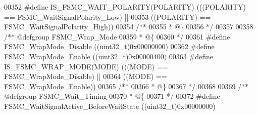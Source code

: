\begin{DoxyCode}
00352 \textcolor{preprocessor}{#}\textcolor{preprocessor}{define} \textcolor{preprocessor}{IS\_FSMC\_WAIT\_POLARITY}\textcolor{preprocessor}{(}\textcolor{preprocessor}{POLARITY}\textcolor{preprocessor}{)} \textcolor{preprocessor}{(}\textcolor{preprocessor}{(}\textcolor{preprocessor}{(}\textcolor{preprocessor}{POLARITY}\textcolor{preprocessor}{)} \textcolor{preprocessor}{==} 
      FSMC_WaitSignalPolarity_Low\textcolor{preprocessor}{)} \textcolor{preprocessor}{||}
00353                                          \textcolor{preprocessor}{(}\textcolor{preprocessor}{(}\textcolor{preprocessor}{POLARITY}\textcolor{preprocessor}{)} \textcolor{preprocessor}{==} 
      FSMC_WaitSignalPolarity_High\textcolor{preprocessor}{)}\textcolor{preprocessor}{)}
00354 \textcolor{comment}{/**}
00355 \textcolor{comment}{  * @\}}
00356 \textcolor{comment}{  */}
00357 
00358 \textcolor{comment}{/** @defgroup FSMC\_Wrap\_Mode }
00359 \textcolor{comment}{  * @\{}
00360 \textcolor{comment}{  */}
00361 \textcolor{preprocessor}{#}\textcolor{preprocessor}{define} \textcolor{preprocessor}{FSMC\_WrapMode\_Disable}                    \textcolor{preprocessor}{(}\textcolor{preprocessor}{(}\textcolor{preprocessor}{uint32\_t}\textcolor{preprocessor}{)}0x00000000\textcolor{preprocessor}{)}
00362 \textcolor{preprocessor}{#}\textcolor{preprocessor}{define} \textcolor{preprocessor}{FSMC\_WrapMode\_Enable}                     \textcolor{preprocessor}{(}\textcolor{preprocessor}{(}\textcolor{preprocessor}{uint32\_t}\textcolor{preprocessor}{)}0x00000400\textcolor{preprocessor}{)}
00363 \textcolor{preprocessor}{#}\textcolor{preprocessor}{define} \textcolor{preprocessor}{IS\_FSMC\_WRAP\_MODE}\textcolor{preprocessor}{(}\textcolor{preprocessor}{MODE}\textcolor{preprocessor}{)} \textcolor{preprocessor}{(}\textcolor{preprocessor}{(}\textcolor{preprocessor}{(}\textcolor{preprocessor}{MODE}\textcolor{preprocessor}{)} \textcolor{preprocessor}{==} FSMC_WrapMode_Disable\textcolor{preprocessor}{)} \textcolor{preprocessor}{||}
00364                                  \textcolor{preprocessor}{(}\textcolor{preprocessor}{(}\textcolor{preprocessor}{MODE}\textcolor{preprocessor}{)} \textcolor{preprocessor}{==} FSMC_WrapMode_Enable\textcolor{preprocessor}{)}\textcolor{preprocessor}{)}
00365 \textcolor{comment}{/**}
00366 \textcolor{comment}{  * @\}}
00367 \textcolor{comment}{  */}
00368 
00369 \textcolor{comment}{/** @defgroup FSMC\_Wait\_Timing }
00370 \textcolor{comment}{  * @\{}
00371 \textcolor{comment}{  */}
00372 \textcolor{preprocessor}{#}\textcolor{preprocessor}{define} \textcolor{preprocessor}{FSMC\_WaitSignalActive\_BeforeWaitState}    \textcolor{preprocessor}{(}\textcolor{preprocessor}{(}\textcolor{preprocessor}{uint32\_t}\textcolor{preprocessor}{)}0x00000000\textcolor{preprocessor}{)}

\end{DoxyCode}
